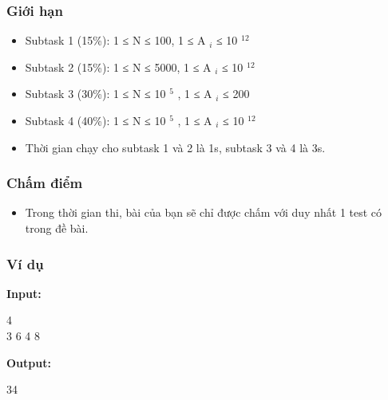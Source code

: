 \subsubsection{   Giới hạn  }
\begin{itemize}
	\item     Subtask 1 (15\%): 1 ≤ N ≤ 100, 1 ≤ A    $_     i    $    ≤ 10    $^     12    $
	\item     Subtask 2 (15\%): 1 ≤ N ≤ 5000, 1 ≤ A    $_     i    $    ≤ 10    $^     12    $
	\item     Subtask 3 (30\%): 1 ≤ N ≤ 10    $^     5    $    , 1 ≤ A    $_     i    $    ≤ 200   
	\item     Subtask 4 (40\%): 1 ≤ N ≤ 10    $^     5    $    , 1 ≤ A    $_     i    $    ≤ 10    $^     12    $
	\item     Thời gian chạy cho subtask 1 và 2 là 1s, subtask 3 và 4 là 3s.   
\end{itemize}

\subsubsection{   Chấm điểm  }
\begin{itemize}
	\item     Trong thời gian thi, bài của bạn sẽ chỉ được chấm với duy nhất 1 test có trong đề bài.   
\end{itemize}

\subsubsection{   Ví dụ  }

\textbf{    Input:   }

   4   
\\   3 6 4 8  

\textbf{    Output:   }

   34  